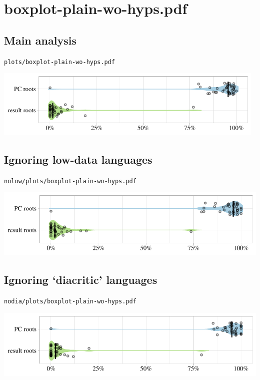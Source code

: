 \eject

\section{boxplot-plain-wo-hyps.pdf}

\subsection{Main analysis}

\texttt{plots/boxplot-plain-wo-hyps.pdf}

\includegraphics[width=0.98\textwidth]{../plots/boxplot-plain-wo-hyps.pdf}

\subsection{Ignoring low-data languages}

\texttt{nolow/plots/boxplot-plain-wo-hyps.pdf}

\includegraphics[width=1.0\textwidth]{../nolow/plots/boxplot-plain-wo-hyps.pdf}

\subsection{Ignoring `diacritic' languages}

\texttt{nodia/plots/boxplot-plain-wo-hyps.pdf}

\includegraphics[width=1.0\textwidth]{../nodia/plots/boxplot-plain-wo-hyps.pdf}

